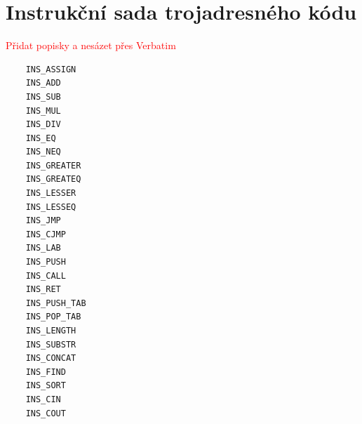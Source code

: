 \documentclass[a4paper, 12pt]{article}
\begin{document}
\section{Instrukční sada trojadresného kódu} \label{instrukce}
\textcolor{red}{Přidat popisky a nesázet přes Verbatim}
\begin{verbatim}
    INS_ASSIGN
    INS_ADD
    INS_SUB
    INS_MUL
    INS_DIV
    INS_EQ
    INS_NEQ
    INS_GREATER
    INS_GREATEQ
    INS_LESSER
    INS_LESSEQ
    INS_JMP
    INS_CJMP
    INS_LAB
    INS_PUSH
    INS_CALL
    INS_RET
    INS_PUSH_TAB
    INS_POP_TAB
    INS_LENGTH
    INS_SUBSTR
    INS_CONCAT
    INS_FIND
    INS_SORT
    INS_CIN
    INS_COUT
\end{verbatim}
\end{document}
